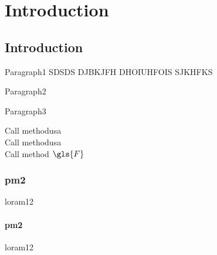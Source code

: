 
\chapter{Introduction} %

\label{c1} %

\lipsum[124]

\section{Introduction}
\par Paragraph1
SDSDS DJBKJFH DHOIUHFOIS SJKHFKS \cite{drewil2022air}
\par Paragraph2
\par Paragraph3







Call method\ac{usa}\\
Call method\ac{usa}\\

Call method $\gls{F}$

\subsection{pm2}
loram12
\subsubsection{pm2}
loram12
